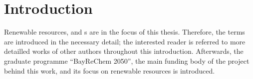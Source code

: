 \chapter{Introduction\label{chap-intro}}
Renewable resources, \lch{} and \eps{}s are in the focus of this thesis. Therefore, the terms are introduced in the necessary detail; the interested reader is referred to more detailled works of other authors throughout this introduction. Afterwards, the graduate programme \enquote{BayReChem 2050}, the main funding body of the project behind this work, and its focus on renewable resources is introduced.

